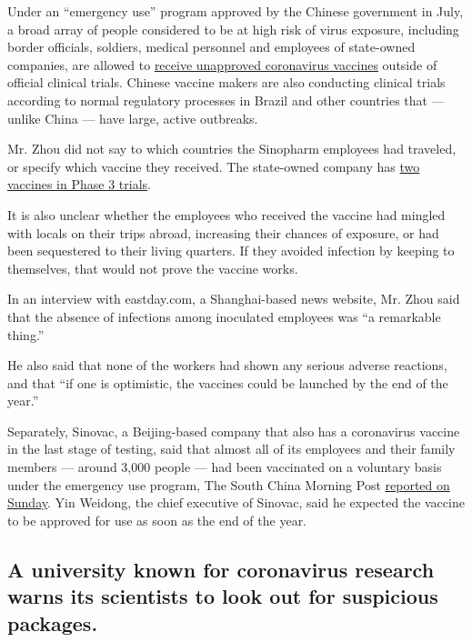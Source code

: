 Under an ``emergency use'' program approved by the Chinese government in
July, a broad array of people considered to be at high risk of virus
exposure, including border officials, soldiers, medical personnel and
employees of state-owned companies, are allowed to
\href{https://www.nytimes3xbfgragh.onion/2020/07/16/business/china-vaccine-coronavirus.html}{receive
unapproved coronavirus vaccines} outside of official clinical trials.
Chinese vaccine makers are also conducting clinical trials according to
normal regulatory processes in Brazil and other countries that ---
unlike China --- have large, active outbreaks.

Mr. Zhou did not say to which countries the Sinopharm employees had
traveled, or specify which vaccine they received. The state-owned
company has
\href{https://www.nytimes3xbfgragh.onion/interactive/2020/science/coronavirus-vaccine-tracker.html}{two
vaccines in Phase 3 trials}.

It is also unclear whether the employees who received the vaccine had
mingled with locals on their trips abroad, increasing their chances of
exposure, or had been sequestered to their living quarters. If they
avoided infection by keeping to themselves, that would not prove the
vaccine works.

In an interview with eastday.com, a Shanghai-based news website, Mr.
Zhou said that the absence of infections among inoculated employees was
``a remarkable thing.''

He also said that none of the workers had shown any serious adverse
reactions, and that ``if one is optimistic, the vaccines could be
launched by the end of the year.''

Separately, Sinovac, a Beijing-based company that also has a coronavirus
vaccine in the last stage of testing, said that almost all of its
employees and their family members --- around 3,000 people --- had been
vaccinated on a voluntary basis under the emergency use program, The
South China Morning Post
\href{https://www.scmp.com/news/china/science/article/3100447/chinese-drug-firm-sinovac-says-thousands-employees-and-their}{reported
on Sunday}. Yin Weidong, the chief executive of Sinovac, said he
expected the vaccine to be approved for use as soon as the end of the
year.

\hypertarget{a-university-known-for-coronavirus-research-warns-its-scientists-to-look-out-for-suspicious-packages}{%
\subsection{A university known for coronavirus research warns its
scientists to look out for suspicious
packages.}\label{a-university-known-for-coronavirus-research-warns-its-scientists-to-look-out-for-suspicious-packages}}

